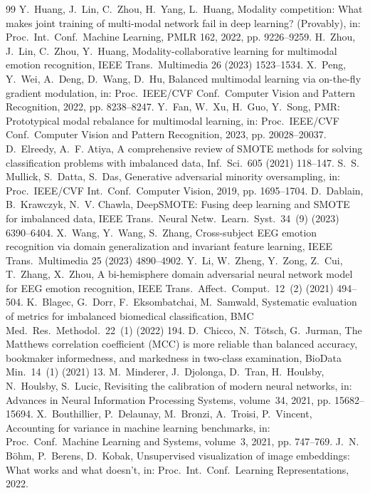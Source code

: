 \documentclass[a4paper,fleqn]{cas-sc}
\begin{document}
\begin{thebibliography}{99}
 Y.~Huang, J.~Lin, C.~Zhou, H.~Yang, L.~Huang, Modality competition: What makes joint training of multi-modal network fail in deep learning? (Provably), in: Proc.\ Int.\ Conf.\ Machine Learning, PMLR 162, 2022, pp. 9226--9259.
 H.~Zhou, J.~Lin, C.~Zhou, Y.~Huang, Modality-collaborative learning for multimodal emotion recognition, IEEE Trans.\ Multimedia 26 (2023) 1523--1534.
 X.~Peng, Y.~Wei, A.~Deng, D.~Wang, D.~Hu, Balanced multimodal learning via on-the-fly gradient modulation, in: Proc.\ IEEE/CVF Conf.\ Computer Vision and Pattern Recognition, 2022, pp. 8238--8247.
 Y.~Fan, W.~Xu, H.~Guo, Y.~Song, PMR: Prototypical modal rebalance for multimodal learning, in: Proc.\ IEEE/CVF Conf.\ Computer Vision and Pattern Recognition, 2023, pp. 20028--20037.
 D.~Elreedy, A.~F. Atiya, A comprehensive review of SMOTE methods for solving classification problems with imbalanced data, Inf.\ Sci.\ 605 (2021) 118--147.
 S.~S. Mullick, S.~Datta, S.~Das, Generative adversarial minority oversampling, in: Proc.\ IEEE/CVF Int.\ Conf.\ Computer Vision, 2019, pp. 1695--1704.
 D.~Dablain, B.~Krawczyk, N.~V. Chawla, DeepSMOTE: Fusing deep learning and SMOTE for imbalanced data, IEEE Trans.\ Neural Netw.\ Learn.\ Syst.\ 34~(9) (2023) 6390--6404.
 X.~Wang, Y.~Wang, S.~Zhang, Cross-subject EEG emotion recognition via domain generalization and invariant feature learning, IEEE Trans.\ Multimedia 25 (2023) 4890--4902.
 Y.~Li, W.~Zheng, Y.~Zong, Z.~Cui, T.~Zhang, X.~Zhou, A bi-hemisphere domain adversarial neural network model for EEG emotion recognition, IEEE Trans.\ Affect.\ Comput.\ 12~(2) (2021) 494--504.
 K.~Blagec, G.~Dorr, F.~Eksombatchai, M.~Samwald, Systematic evaluation of metrics for imbalanced biomedical classification, BMC Med.\ Res.\ Methodol.\ 22~(1) (2022) 194.
 D.~Chicco, N.~T{\"o}tsch, G.~Jurman, The Matthews correlation coefficient (MCC) is more reliable than balanced accuracy, bookmaker informedness, and markedness in two-class examination, BioData Min.\ 14~(1) (2021) 13.
 M.~Minderer, J.~Djolonga, D.~Tran, H.~Houlsby, N.~Houlsby, S.~Lucic, Revisiting the calibration of modern neural networks, in: Advances in Neural Information Processing Systems, volume~34, 2021, pp. 15682--15694.
 X.~Bouthillier, P.~Delaunay, M.~Bronzi, A.~Troisi, P.~Vincent, Accounting for variance in machine learning benchmarks, in: Proc.\ Conf.\ Machine Learning and Systems, volume~3, 2021, pp. 747--769.
 J.~N. B{\"o}hm, P.~Berens, D.~Kobak, Unsupervised visualization of image embeddings: What works and what doesn't, in: Proc.\ Int.\ Conf.\ Learning Representations, 2022.
\end{thebibliography}

\printcredits
\end{document}
